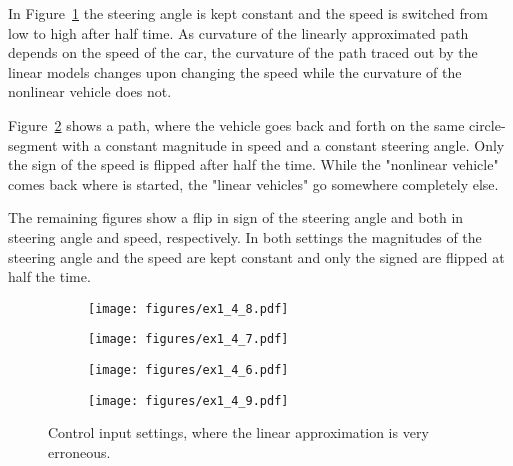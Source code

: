 In Figure~\ref{fig:ex8} the steering angle is kept constant and the speed is switched from low to high after half time. 
As curvature of the linearly approximated path depends on the speed of the car, the curvature of the path traced out by the linear models changes upon changing the speed while the curvature of the nonlinear vehicle does not.

Figure~\ref{fig:ex7} shows a path, where the vehicle goes back and forth on the same circle-segment with a constant magnitude in speed and a constant steering angle.
Only the sign of the speed is flipped after half the time.
While the "nonlinear vehicle" comes back where is started, the "linear vehicles" go somewhere completely else.

The remaining figures show a flip in sign of the steering angle and both in steering angle and speed, respectively.
In both settings the magnitudes of the steering angle and the speed are kept constant and only the signed are flipped at half the time.

\begin{figure}[h]
	\centering
	\begin{subfigure}{0.49\textwidth}
		\texttt{[image: figures/ex1\_4\_8.pdf]}
		\label{fig:ex8}
	\end{subfigure}
	\begin{subfigure}{0.49\textwidth}
		\texttt{[image: figures/ex1\_4\_7.pdf]}
		\label{fig:ex7}
	\end{subfigure}
	\begin{subfigure}{0.49\textwidth}
		\texttt{[image: figures/ex1\_4\_6.pdf]}
		\label{fig:ex6}
	\end{subfigure}
	\begin{subfigure}{0.49\textwidth}
		\texttt{[image: figures/ex1\_4\_9.pdf]}
		\label{fig:ex9}
	\end{subfigure}
	\caption{Control input settings, where the linear approximation is very erroneous.}
	\label{fig:ex6789}
\end{figure}


